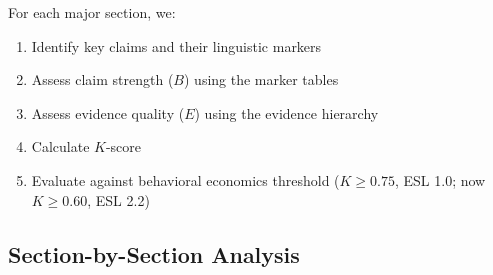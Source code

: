 \documentclass[11pt,a4paper]{article}
\begin{document}
For each major section, we:
\begin{enumerate}
    \item Identify key claims and their linguistic markers
    \item Assess claim strength ($B$) using the marker tables
    \item Assess evidence quality ($E$) using the evidence hierarchy
    \item Calculate $K$-score
    \item Evaluate against behavioral economics threshold ($K \geq 0.75$, ESL 1.0; now $K \geq 0.60$, ESL 2.2)
\end{enumerate}

\subsection{Section-by-Section Analysis}
\end{document}
